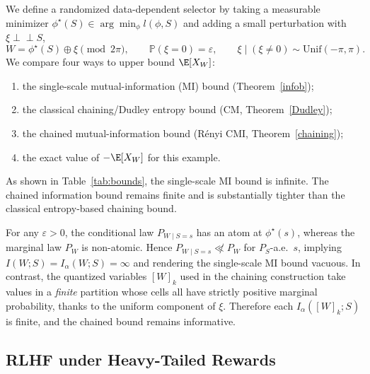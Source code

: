 \documentclass[11pt]{article}
\begin{document}
We define a randomized data-dependent selector by taking a measurable minimizer
$\phi^\star(S)\in\arg\min_\phi l(\phi,S)$ and adding a small perturbation with $\xi\perp\!\!\!\perp S$,
\[
W=\phi^\star(S)\oplus \xi \pmod{2\pi},\qquad
\mathbb P(\xi=0)=\varepsilon,\qquad
\xi\mid(\xi\neq0)\sim\mathrm{Unif}(-\pi,\pi).
\]
We compare four ways to upper bound $\E[X_W]$:
\begin{enumerate}
\item[(i)] the single-scale mutual-information (MI) bound (Theorem~\ref{infob});
\item[(ii)] the classical chaining/Dudley entropy bound (CM, Theorem~\ref{Dudley});
\item[(iii)] the chained mutual-information bound (R\'enyi CMI, Theorem~\ref{chaining});
\item[(iv)] the exact value of $-\E[X_W]$ for this example. 
\end{enumerate}
As shown in
Table~\ref{tab:bounds}, the single-scale MI bound is infinite. The chained information bound remains finite and is substantially
tighter than the classical entropy-based chaining bound.

For any $\varepsilon>0$, the conditional law $P_{W\mid S=s}$ has an atom at
$\phi^\star(s)$, whereas the marginal law $P_W$ is non-atomic. Hence
$P_{W\mid S=s}\not\ll P_W$ for $P_S$-a.e.\ $s$, implying
$I(W;S)=I_\alpha(W;S)=\infty$ and rendering the single-scale MI bound
vacuous. In contrast, the quantized variables $[W]_k$ used in the chaining
construction take values in a \emph{finite} partition whose cells all have
strictly positive marginal probability, thanks to the uniform component of
$\xi$. Therefore each $I_\alpha([W]_k;S)$ is finite, and the chained bound
remains informative.





\subsection{RLHF under Heavy-Tailed Rewards}\label{sec:rlhf-experiments}
\end{document}
